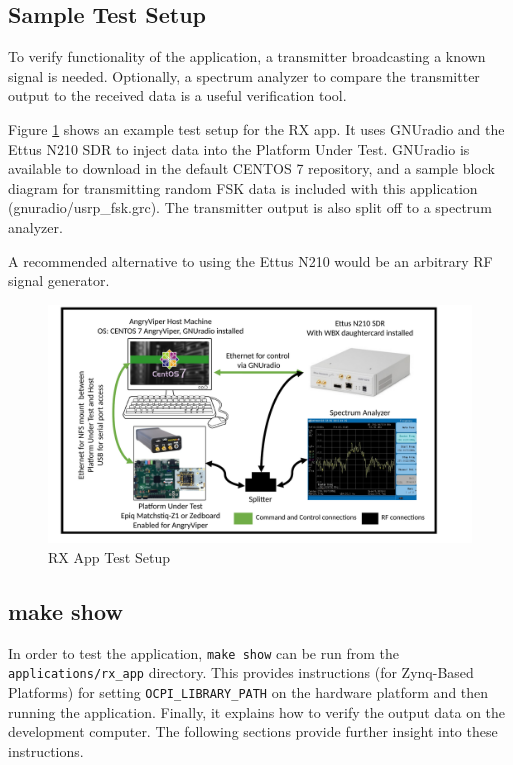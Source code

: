 \documentclass{article}
\begin{document}
\subsection{Sample Test Setup}
\noindent To verify functionality of the application, a transmitter broadcasting a known signal is needed. Optionally, a spectrum analyzer to compare the transmitter output to the received data is a useful verification tool.\par\medskip
\noindent Figure \ref{fig:rx_app_test_setup} shows an example test setup for the RX app. It uses GNUradio and the Ettus N210 SDR to inject data into the Platform Under Test. GNUradio is available to download in the default CENTOS 7 repository, and a sample block diagram for transmitting random FSK data is included with this application (gnuradio/usrp\_fsk.grc). The transmitter output is also split off to a spectrum analyzer.\par\bigskip
\noindent A recommended alternative to using the Ettus N210 would be an arbitrary RF signal generator.
	\begin{figure}[h]
	 	\centering
		\includegraphics[scale=.55]{rx_app_test_setup}
		\caption{RX App Test Setup}
		\label{fig:rx_app_test_setup}
	\end{figure}
\subsection{make show}
\noindent In order to test the application, \texttt{make show} can be run from the \texttt{applications/rx\_app} directory. This provides instructions (for Zynq-Based Platforms) for setting \texttt{OCPI\_LIBRARY\_PATH} on the hardware platform and then running the application. Finally, it explains how to verify the output data on the development computer. The following sections provide further insight into these instructions.
\end{document}
